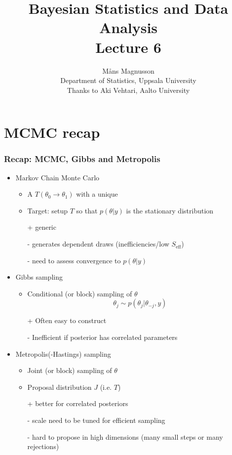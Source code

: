 \documentclass[10pt]{beamer}
\title[]{{\color{black}Bayesian Statistics and Data Analysis \\ Lecture 6}}
\author[]{M{\aa}ns Magnusson \\ Department of Statistics, Uppsala University \\ Thanks to Aki Vehtari, Aalto University}
\date{}
\begin{document}
\frame{\titlepage
}



\section{MCMC recap}

\begin{frame}
\frametitle{Recap: MCMC, Gibbs and Metropolis}

\begin{itemize}
\item Markov Chain Monte Carlo
\begin{itemize}
\item A  $T(\theta_0 \rightarrow \theta_1)$ with a unique 
\item Target: setup $T$ so that $p(\theta|y)$ is the stationary distribution\pause
\item [+] generic \pause
\item [-] generates dependent draws (inefficiencies/low $S_\text{eff}$)
\item [-] need to assess convergence to $p(\theta|y)$
\end{itemize}
\pause
\item Gibbs sampling
\begin{itemize}
\item Conditional (or block) sampling of $\theta$
\[
\theta_j \sim p(\theta_j|\theta_{-j}, y)
\]
\pause
\item[+] Often easy to construct \pause
\item[-] Inefficient if posterior has correlated parameters
\end{itemize}
\pause
\item Metropolis(-Hastings) sampling
\begin{itemize}
\item Joint (or block) sampling of $\theta$
\item Proposal distribution $J$ (i.e. $T$)\pause
\item[+] better for correlated posteriors\pause
\item[-] scale need to be tuned for efficient sampling
\item[-] hard to propose in high dimensions (many small steps or many rejections)
\end{itemize}
\end{itemize}

\end{frame}
\end{document}
